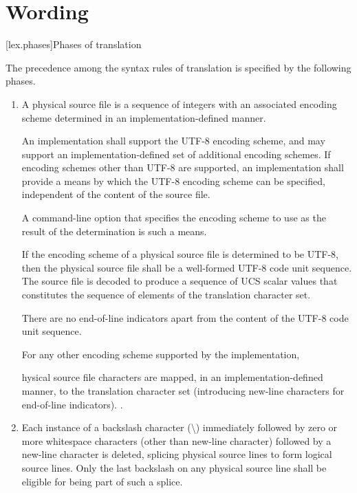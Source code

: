 \documentclass{wg21}
\begin{document}
\section{Wording}

[lex.phases]{Phases of translation}%

\pnum
{}%
The precedence among the syntax rules of translation is specified by the
following phases.

\begin{enumerate}
    \item

\begin{addedblock}
    A physical source file is a sequence of integers with an associated encoding scheme determined in an
    implementation-defined manner.

    An implementation shall support the UTF-8 encoding scheme, and may support an implementation-defined set of additional encoding schemes.
    If encoding schemes other than UTF-8 are supported,
    an implementation shall provide a means by which the UTF-8 encoding scheme can be specified, independent of the content of the source file. \begin{note} A command-line option that specifies the encoding scheme to use as the result of the determination is such a means.\end{note}
    
    If the encoding scheme of a physical source file is determined to be UTF-8, then the
    physical source file shall be a well-formed UTF-8 code unit sequence. The source file is decoded
    to produce a sequence of UCS scalar values that constitutes the sequence of
    elements of the translation character set. \begin{note} There are no end-of-line
    indicators apart from the content of the UTF-8 code unit sequence. \end{note}
    
    For any other encoding scheme supported by the implementation, \end{addedblock}hysical source file characters are mapped, in an
implementation-defined manner, to the translation character set (introducing new-line characters for end-of-line
indicators).
.

\item
{}%
%
Each instance of a backslash character (\textbackslash)
immediately followed by zero or more whitespace characters (other than new-line character) followed by a new-line character is deleted, splicing
physical source lines to form logical source lines. Only the last
backslash on any physical source line shall be eligible for being part
of such a splice.

\end{enumerate}
\end{document}
